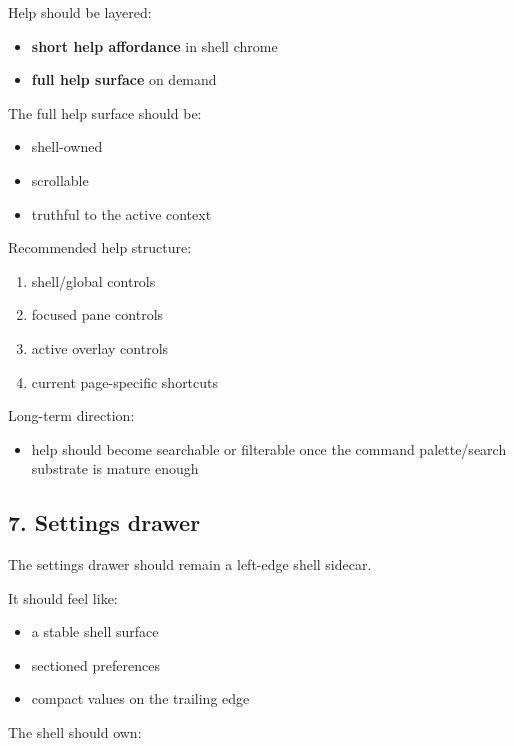 Help should be layered:

\begin{itemize}
\tightlist
\item
  \textbf{short help affordance} in shell chrome
\item
  \textbf{full help surface} on demand
\end{itemize}

The full help surface should be:

\begin{itemize}
\tightlist
\item
  shell-owned
\item
  scrollable
\item
  truthful to the active context
\end{itemize}

Recommended help structure:

\begin{enumerate}
\def\labelenumi{\arabic{enumi}.}
\tightlist
\item
  shell/global controls
\item
  focused pane controls
\item
  active overlay controls
\item
  current page-specific shortcuts
\end{enumerate}

Long-term direction:

\begin{itemize}
\tightlist
\item
  help should become searchable or filterable once the command palette/search substrate is mature enough
\end{itemize}

\subsection{7. Settings drawer}\label{record-047-settings-drawer}

The settings drawer should remain a left-edge shell sidecar.

It should feel like:

\begin{itemize}
\tightlist
\item
  a stable shell surface
\item
  sectioned preferences
\item
  compact values on the trailing edge
\end{itemize}

The shell should own:

